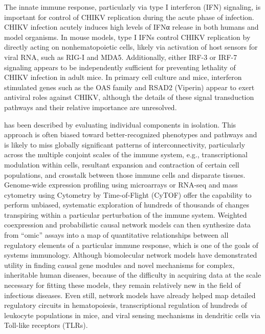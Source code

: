 The innate immune response, particularly via type I interferon (IFN) signaling, is important for control of CHIKV replication during the acute phase of infection.\autocite{Burt2017,Schilte2010} CHIKV infection acutely induces high levels of IFNα release in both humans and model organisms.\autocite{Labadie2010,Teng2015} In mouse models, type I IFNs control CHIKV replication by directly acting on nonhematopoietic cells, likely via activation of host sensors for viral RNA, such as RIG-I and MDA5.\autocite{Schilte2010} Additionally, either IRF-3 or IRF-7 signaling appears to be independently sufficient for preventing lethality of CHIKV infection in adult mice.\autocite{Schilte2012} In primary cell culture and mice, interferon stimulated genes such as the OAS family and RSAD2 (Viperin) appear to exert antiviral roles against CHIKV, although the details of these signal transduction pathways and their relative importance are unresolved.\autocite{Burt2017}

 has been described by evaluating individual components in isolation. This approach is often biased toward better-recognized phenotypes and pathways and is likely to miss globally significant patterns of interconnectivity, particularly across the multiple conjoint scales of the immune system, e.g., transcriptional modulation within cells, resultant expansion and contraction of certain cell populations, and crosstalk between those immune cells and disparate tissues.\autocite{Kidd2014} Genome-wide expression profiling using microarrays or RNA-seq and mass cytometry using Cytometry by Time-of-Flight (CyTOF) offer the capability to perform unbiased, systematic exploration of hundreds of thousands of changes transpiring within a particular perturbation of the immune system. Weighted coexpression and probabilistic causal network models can then synthesize data from “omic” assays into a map of quantitative relationships between all regulatory elements of a particular immune response, which is one of the goals of systems immunology.\autocite{Arazi2013,Germain2011} Although biomolecular network models have demonstrated utility in finding causal gene modules and novel mechanisms for complex, inheritable human diseases,\autocite{Chen2008,Emilsson2008,Huan2015,Zhang2013} because of the difficulty in acquiring data at the scale necessary for fitting these models, they remain relatively new in the field of infectious diseases. Even still, network models have already helped map detailed regulatory circuits in hematopoiesis, transcriptional regulation of hundreds of leukocyte populations in mice, and viral sensing mechanisms in dendritic cells via Toll-like receptors (TLRs).\autocite{Kidd2014}

